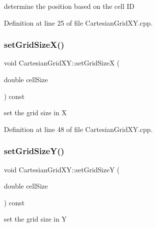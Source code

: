 determine the position based on the cell ID 



Definition at line 25 of file Cartesian\+Grid\+X\+Y.\+cpp.

\hypertarget{class_d_d4hep_1_1_geometry_1_1_cartesian_grid_x_y_a38a173458549e13152de598c4a2866ba}{}\label{class_d_d4hep_1_1_geometry_1_1_cartesian_grid_x_y_a38a173458549e13152de598c4a2866ba} 
\subsubsection{\texorpdfstring{set\+Grid\+Size\+X()}{setGridSizeX()}}
{\footnotesize\ttfamily void Cartesian\+Grid\+X\+Y\+::set\+Grid\+SizeX (\begin{DoxyParamCaption}\item[{double}]{cell\+Size }\end{DoxyParamCaption}) const}



set the grid size in X 



Definition at line 48 of file Cartesian\+Grid\+X\+Y.\+cpp.

\hypertarget{class_d_d4hep_1_1_geometry_1_1_cartesian_grid_x_y_a1e23de21ba73945930f2ae38a7e25f9f}{}\label{class_d_d4hep_1_1_geometry_1_1_cartesian_grid_x_y_a1e23de21ba73945930f2ae38a7e25f9f} 
\subsubsection{\texorpdfstring{set\+Grid\+Size\+Y()}{setGridSizeY()}}
{\footnotesize\ttfamily void Cartesian\+Grid\+X\+Y\+::set\+Grid\+SizeY (\begin{DoxyParamCaption}\item[{double}]{cell\+Size }\end{DoxyParamCaption}) const}



set the grid size in Y 



